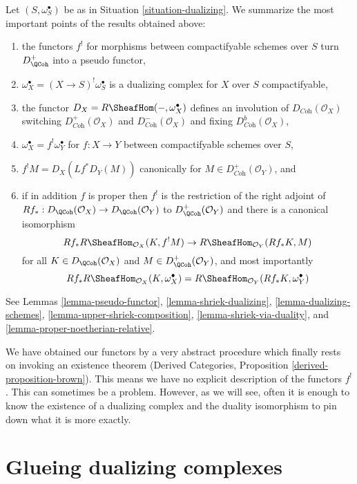 \noindent
Let $(S, \omega_S^\bullet)$ be as in Situation \ref{situation-dualizing}.
We summarize the most important points of the results obtained above:
\begin{enumerate}
\item the functors $f^!$ for morphisms between compactifyable
schemes over $S$ turn $D_\QCoh^+$ into a pseudo functor,
\item $\omega_X^\bullet = (X \to S)^!\omega_S^\bullet$
is a dualizing complex for $X$ over $S$ compactifyable,
\item the functor $D_X = R\SheafHom(-, \omega_X^\bullet)$
defines an involution of $D_{\textit{Coh}}(\mathcal{O}_X)$
switching $D_{\textit{Coh}}^+(\mathcal{O}_X)$ and
$D_{\textit{Coh}}^-(\mathcal{O}_X)$ and fixing
$D_{\textit{Coh}}^b(\mathcal{O}_X)$,
\item $\omega_X^\bullet = f^!\omega_Y^\bullet$ for $f : X \to Y$
between compactifyable schemes over $S$,
\item $f^!M = D_X(Lf^*D_Y(M))$ canonically for
$M \in D_{\textit{Coh}}^+(\mathcal{O}_Y)$, and
\item if in addition $f$ is proper then $f^!$ is the restriction
of the right adjoint of
$Rf_* : D_\QCoh(\mathcal{O}_X) \to D_\QCoh(\mathcal{O}_Y)$
to $D_\QCoh^+(\mathcal{O}_Y)$ and there is a canonical isomorphism
$$
Rf_*R\SheafHom_{\mathcal{O}_X}(K, f^!M)
\to
R\SheafHom_{\mathcal{O}_Y}(Rf_*K, M)
$$
for all $K \in D_\QCoh(\mathcal{O}_X)$ and $M \in D_\QCoh^+(\mathcal{O}_Y)$,
and most importantly
$$
Rf_*R\SheafHom_{\mathcal{O}_X}(K, \omega_X^\bullet) =
R\SheafHom_{\mathcal{O}_Y}(Rf_*K, \omega_Y^\bullet)
$$
\end{enumerate}
See Lemmas
\ref{lemma-pseudo-functor},
\ref{lemma-shriek-dualizing},
\ref{lemma-dualizing-schemes},
\ref{lemma-upper-shriek-composition},
\ref{lemma-shriek-via-duality}, and
\ref{lemma-proper-noetherian-relative}. 

\medskip\noindent
We have obtained our functors by a very abstract procedure
which finally rests on invoking an existence theorem
(Derived Categories, Proposition \ref{derived-proposition-brown}).
This means we have no explicit description of the functors $f^!$.
This can sometimes be a problem. However, as we will see,
often it is enough to know the existence of a dualizing complex
and the duality isomorphism to pin down what it is more exactly.






\section{Glueing dualizing complexes}
\label{section-glue}

